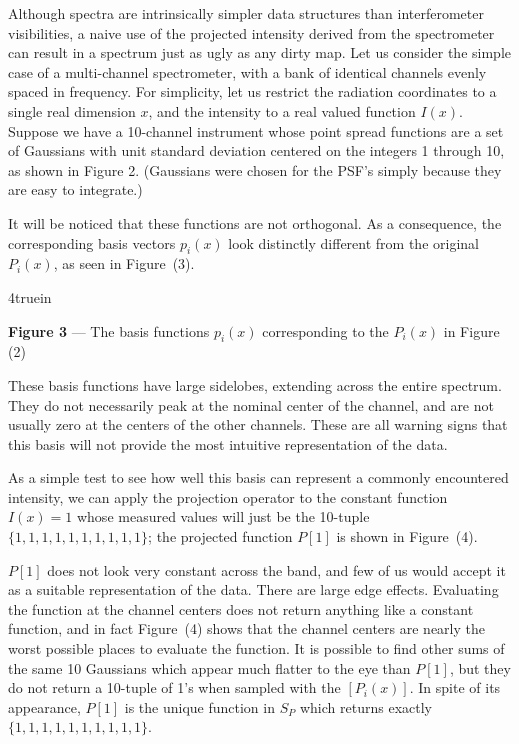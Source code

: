 Although spectra are intrinsically simpler data structures than 
interferometer visibilities, a naive use of the projected intensity
derived from the spectrometer can result in a spectrum just as ugly as 
any dirty map. Let us consider the simple case 
of a multi-channel spectrometer, with a bank of identical channels evenly 
spaced in frequency. For simplicity, let us restrict the radiation 
coordinates to a single 
real dimension $x$, and the intensity to a real valued function $I(x)$. 
Suppose we have a 10-channel instrument whose point spread functions are a 
set of Gaussians with unit standard deviation centered on the integers 1 
through 10, as shown in Figure 2. (Gaussians were chosen for the PSF's 
simply because they are easy to integrate.)

It will be noticed that these functions are not orthogonal.  As a 
consequence, the corresponding basis vectors $p_i(x)$ look distinctly 
different from the original $P_i(x)$, as seen in Figure~(3).

\epsfxsize 4truein
\centerline {}
\centerline {{\bf Figure 3} --- The basis functions $p_i(x)$ corresponding 
to the $P_i(x)$ in Figure (2)}

These basis functions have large sidelobes, extending 
across the entire spectrum. They do not necessarily peak at the nominal 
center of the channel, and are not usually zero at the centers of the other 
channels. These are all warning signs that this basis will not provide the 
most intuitive representation of the data.

As a simple test to see how well this basis can represent a commonly 
encountered intensity, we can apply the projection operator to the 
constant function $I(x) = 1$ whose measured values will just be the 
10-tuple $\lbrace 1,1,1,1,1,1,1,1,1,1\rbrace$; the projected function 
$P[1]$ is shown in Figure~(4).

$P[1]$ does not look very constant across the band, and few of 
us would accept it as a suitable representation of the data. There are large 
edge effects. Evaluating the function at the channel centers does not 
return anything like a constant function, and in fact Figure~(4) shows 
that the channel centers are nearly the worst possible places to evaluate 
the function. It is possible to find other sums of the same 10 Gaussians
which appear much flatter to the eye than $P[1]$, but they do not return a
10-tuple of 1's when sampled with the $[P_i(x)]$. In spite of its appearance,
$P[1]$ is the unique function in $S_P$ which returns exactly $\lbrace 
1,1,1,1,1,1,1,1,1,1\rbrace$.

